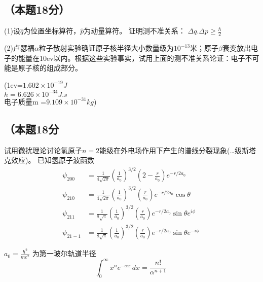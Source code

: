 \subsection{（本题18分）}
(1)设$\hat q$为位置坐标算符，$\hat p$为动量算符。
证明测不准关系：
$\Delta q.\Delta p\ge \frac{\hbar}{2}$

(2)卢瑟福$\alpha$粒子散射实验确证原子核半径大小数量级为$10^{-13}$米；原子$\beta$衰变放出电子的能量在10ev以内。根据这些实验事实，试用上面的测不准关系论证：电子不可能是原子核的组成部分。

(1ev=$1.602\times10^{-19}J$\\
$h=6.626\times10^{-34}J.s$\\
电子质量m =$9.109\times {10^{-31}kg}$)

\subsection{（本题18分}
试用微扰理论讨论氢原子$n=2$能级在外电场作用下产生的谱线分裂现象(…级斯塔克效应)。
已知氢原子波函数
\begin{align}
\psi_{200} &= \frac{1}{4\sqrt{2\pi}} \left( \frac{1}{a_0} \right)^{3/2} (2 - \frac{r}{a_0}) e^{-r/2a_0} \\
\psi_{210} &= \frac{1}{4\sqrt{2\pi}} \left( \frac{1}{a_0} \right)^{3/2} \left( \frac{r}{a_0} \right) e^{-r/2a_0} \cos \theta \\
\psi_{211} &= \frac{1}{8\sqrt{\pi}} \left( \frac{1}{a_0} \right)^{3/2} \left( \frac{r}{a_0} \right) e^{-r/2a_0} \sin \theta e^{i\phi} \\
\psi_{21-1} &= \frac{1}{8\sqrt{\pi}} \left( \frac{1}{a_0} \right)^{3/2} \left( \frac{r}{a_0} \right) e^{-r/2a_0} \sin \theta e^{-i\phi}~
\end{align}

$ a_0 = \frac{\hbar^2}{me^2}$ 为第一玻尔轨道半径
$$ \int_{0}^{\infty} x^n e^{-\alpha x} \, dx = \frac{n!}{\alpha^{n+1}}~$$